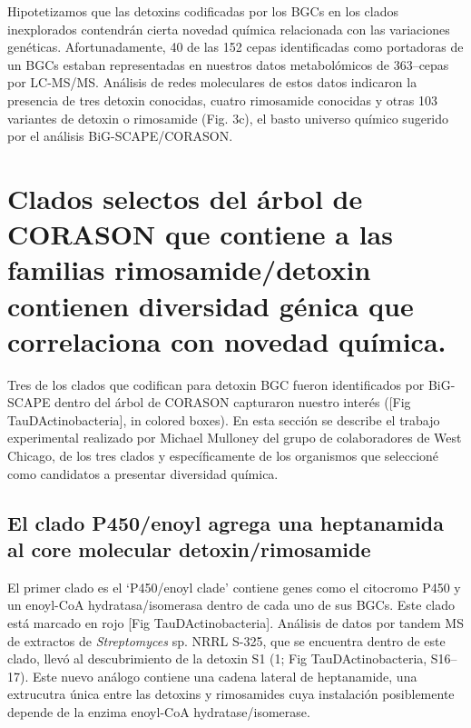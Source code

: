 \documentclass[12pt,twoside]{reedthesis}
\begin{document}
  Hipotetizamos que las detoxins codificadas por los BGCs en los clados
  inexplorados contendrán cierta novedad química relacionada con las
  variaciones genéticas. Afortunadamente, 40 de las 152 cepas
  identificadas como portadoras de un BGCs estaban representadas en
  nuestros datos metabolómicos de 363--cepas por LC-MS/MS. Análisis de
  redes moleculares de estos datos indicaron la presencia de tres detoxin
  conocidas, cuatro rimosamide conocidas y otras 103 variantes de detoxin
  o rimosamide (Fig. 3c), el basto universo químico sugerido por el
  análisis BiG-SCAPE/CORASON.
  
  \section{Clados selectos del árbol de CORASON que contiene a las
  familias rimosamide/detoxin contienen diversidad génica que correlaciona
  con novedad
  química.}\label{clados-selectos-del-arbol-de-corason-que-contiene-a-las-familias-rimosamidedetoxin-contienen-diversidad-genica-que-correlaciona-con-novedad-quimica.}
  
  Tres de los clados que codifican para detoxin BGC fueron identificados
  por BiG-SCAPE dentro del árbol de CORASON capturaron nuestro interés
  ({[}Fig TauDActinobacteria{]}, in colored boxes). En esta sección se
  describe el trabajo experimental realizado por Michael Mulloney del
  grupo de colaboradores de West Chicago, de los tres clados y
  específicamente de los organismos que seleccioné como candidatos a
  presentar diversidad química.
  
  \subsection{El clado P450/enoyl agrega una heptanamida al core molecular
  detoxin/rimosamide}\label{el-clado-p450enoyl-agrega-una-heptanamida-al-core-molecular-detoxinrimosamide}
  
  El primer clado es el `P450/enoyl clade' contiene genes como el
  citocromo P450 y un enoyl-CoA hydratasa/isomerasa dentro de cada uno de
  sus BGCs. Este clado está marcado en rojo {[}Fig TauDActinobacteria{]}.
  Análisis de datos por tandem MS de extractos de \emph{Streptomyces} sp.
  NRRL S-325, que se encuentra dentro de este clado, llevó al
  descubrimiento de la detoxin S1 (1; Fig TauDActinobacteria, S16--17).
  Este nuevo análogo contiene una cadena lateral de heptanamide, una
  extrucutra única entre las detoxins y rimosamides cuya instalación
  posiblemente depende de la enzima enoyl-CoA hydratase/isomerase.
  
\end{document}
